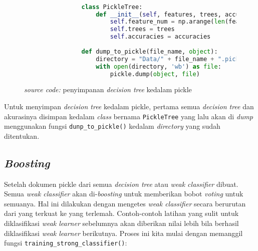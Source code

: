 		\begin{figure}[H]
			\begin{lstlisting}[language=Python, basicstyle=\tiny]

				class PickleTree:
					def __init__(self, features, trees, accuracies):
						self.feature_num = np.arange(len(features))
						self.trees = trees
						self.accuracies = accuracies
					
				def dump_to_pickle(file_name, object):
					directory = "Data/" + file_name + ".pickle"
					with open(directory, 'wb') as file:
						pickle.dump(object, file)
			\end{lstlisting}
			\caption{\emph{source code:} penyimpanan \emph{decision tree} kedalam pickle}
			\label{code: save decision tree}
		\end{figure}

		Untuk menyimpan \emph{decision tree} kedalam pickle, pertama semua \emph{decision tree} 
		dan akurasinya disimpan kedalam \textit{class} bernama \texttt{PickleTree} yang lalu akan di \textit{dump} 
		menggunakan fungsi \texttt{dunp\_to\_pickle()} kedalam \textit{directory} yang sudah ditentukan.

	\subsection{\textit{Boosting}}

		Setelah dokumen pickle dari semua \emph{decision tree} atau \emph{weak classifier} 
		dibuat. Semua \emph{weak classifier} akan di-\emph{boosting} untuk memberikan bobot \textit{voting} 
		untuk semuanya. Hal ini dilakukan dengan mengetes \emph{weak classifier} secara berurutan dari 
		yang terkuat ke yang terlemah. Contoh-contoh latihan yang sulit untuk diklasifikasi 
		\emph{weak learner} sebelumnya akan diberikan nilai lebih bila berhasil diklasifikasi 
		\emph{weak learner} berikutnya. Proses ini kita mulai dengan memanggil fungsi 
		\texttt{training\_strong\_classifier()}:

